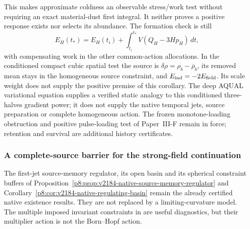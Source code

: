\documentclass[12pt,a4paper]{article}
\begin{document}
This makes approximate coldness an observable stress/work test without
requiring an exact material-dust first integral. It neither proves a
positive response exists nor selects its abundance. The formation check
is still
\[
 E_H(t_*)=E_H(t_i)+\int_{t_i}^{t_*}V(Q_H-3Hp_H)\,dt,
\]
with compensating work in the other common-action allocations. In the
conditioned compact cubic spatial test the source is
$\delta\rho=\rho_b-\overline\rho_b$, its removed mean stays in the
homogeneous source constraint, and $E_{\rm ind}=-2E_{\rm field}$.
Its scale weight does not supply the positive premise of this corollary.
The deep AQUAL variational equation
\cite{BekensteinMilgrom1984AQUAL} supplies a verified static analogy to
this conditioned three-halves gradient power; it does not supply the
native temporal jets, source preparation or complete homogeneous action.
The frozen monotone-loading obstruction and positive pulse-loading test
of Paper~III-F remain in force; retention and survival are additional
history certificates.

\subsubsection{A complete-source barrier for the strong-field continuation}
The first-jet source-memory regulator, its open basin and its spherical
constraint buffers of
Proposition~\ref{p8:prop:v2184-native-source-memory-regulator} and
Corollary~\ref{p8:cor:v2184-native-regulating-basin} remain the already
certified native existence results. They are not replaced by a
limiting-curvature model. The multiple imposed invariant constraints in
\cite{LitBHFrolovZelnikov2022} are useful diagnostics, but their multiplier
action is not the Born--Hopf action.
\end{document}
